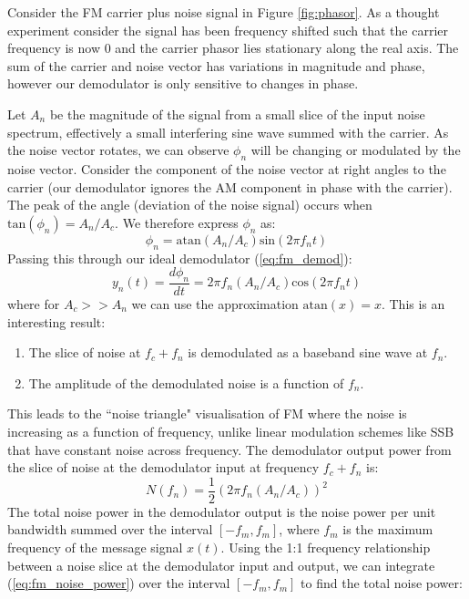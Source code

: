 \documentclass{article}
\begin{document}
Consider the FM carrier plus noise signal in Figure \ref{fig:phasor}.  As a thought experiment consider the signal has been frequency shifted such that the carrier frequency is now 0 and the carrier phasor lies stationary along the real axis.  The sum of the carrier and noise vector has variations in magnitude and phase, however our demodulator is only sensitive to changes in phase. 

Let $A_n$ be the magnitude of the signal from a small slice of the input noise spectrum, effectively a small interfering sine wave summed with the carrier. As the noise vector rotates, we can observe $\phi_n$ will be changing or modulated by the noise vector. Consider the component of the noise vector at right angles to the carrier (our demodulator ignores the AM component in phase with the carrier). The peak of the angle (deviation of the noise signal) occurs when $\mathrm{tan}(\phi_n) = A_n/A_c$.  We therefore express $\phi_n$ as:
\begin{equation}
\phi_n = \mathrm{atan}(A_n/A_c)\mathrm{sin}(2 \pi f_n t)
\end{equation}
Passing this through our ideal demodulator (\ref{eq:fm_demod}):
\begin{equation}
y_n(t) = \frac{d\phi_n}{dt} =  2 \pi f_n (A_n/A_c) \mathrm{cos}(2 \pi f_n t)
\end{equation}
where for $A_c>>A_n$ we can use the approximation $\mathrm{atan}(x)=x$.
This is an interesting result:
\begin{enumerate}
\item The slice of noise at $f_c+f_n$ is demodulated as a baseband sine wave at $f_n$.
\item The amplitude of the demodulated noise is a function of $f_n$.
\end{enumerate}
This leads to the ``noise triangle" visualisation of FM where the noise is increasing as a function of frequency, unlike linear modulation schemes like SSB that have constant noise across frequency. The demodulator output power from the slice of noise at the demodulator input at frequency $f_c+f_n$ is:
\begin{equation}
\label{eq:fm_noise_power}
N(f_n) =  \frac{1}{2}(2 \pi f_n (A_n/A_c) )^2 
\end{equation}
The total noise power in the demodulator output is the noise power per unit bandwidth summed over the interval $[-f_m,f_m]$, where $f_m$ is the maximum frequency of the message signal $x(t)$. Using the 1:1 frequency relationship between a noise slice at the demodulator input and output, we can integrate (\ref{eq:fm_noise_power}) over the interval $[-f_m,f_m]$ to find the total noise power:
\end{document}
